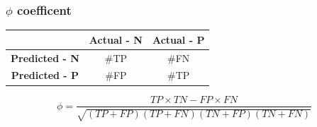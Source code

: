 \documentclass[compress]{beamer}
\begin{document}
\begin{frame}
\begin{center}
\frametitle{$\phi$ coefficent}
\begin{table}[]
\begin{tabular}{c|c|c}
\multicolumn{1}{l|}{\textbf{}} & \textbf{Actual - N} & \textbf{Actual - P} \\ \hline
\textbf{Predicted - N}         & \#TP                & \#FN                \\ \hline
\textbf{Predicted - P}         & \#FP                & \#TP               
\end{tabular}
\end{table}
\begin{equation*}
\phi=\dfrac{TP\times TN - FP\times FN}{\sqrt{\left(TP+FP\right)\left(TP+FN\right)\left(TN+FP\right)\left(TN+FN\right)}}
\end{equation*}
\end{center}
\end{frame}
\end{document}
